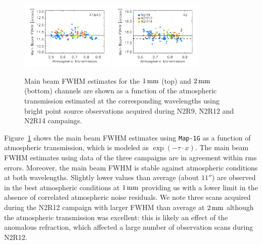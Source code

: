 \begin{figure}[!thbp]
\begin{center}
  \includegraphics[clip, width=0.4\textwidth]{Figures/plot_FWHM_vs_atmtrans_mb_radius_binning2_1mm.pdf}
  \includegraphics[clip, width=0.4\textwidth]{Figures/plot_FWHM_vs_atmtrans_mb_radius_binning2_a2.pdf}
  \caption[Main Beam FWHM]{Main beam FWHM estimates for the
    $1\,\rm{mm}$ (top) and $2\,\rm{mm}$ (bottom) channels are shown as
    a function of the atmospheric transmission estimated at the
    corresponding wavelengths using bright point source observations
  acquired during N2R9, N2R12 and N2R14 campaings. }
\label{fig:fwhm_map_atmtrans}
\end{center}
\end{figure}

Figure~\ref{fig:fwhm_map_atmtrans} shows the main beam FWHM estimates
using {\tt Map-1G} as a function of atmospheric transmission,
which is modeled as $\exp{\left(-\tau \cdot x\right)}$. %
The main beam FWHM estimates using data of the three campaigns are in
agreement within rms errors. Moreover, the main beam FWHM is stable
against atmospheric conditions at both wavelengths. Slightly lower
values than average (about $11''$) are observed in the best
atmospheric conditions at $1\,\rm{mm}$ providing us with a lower limit
in the absence of correlated atmospheric noise residuals. We note
three scans acquired during the N2R12 campaign with larger FWHM than average at
$2\,\rm{mm}$ although the atmospheric transmission was excellent: this
is likely an effect of the anomalous refraction, which affected a
large number of observation scans during N2R12. 



